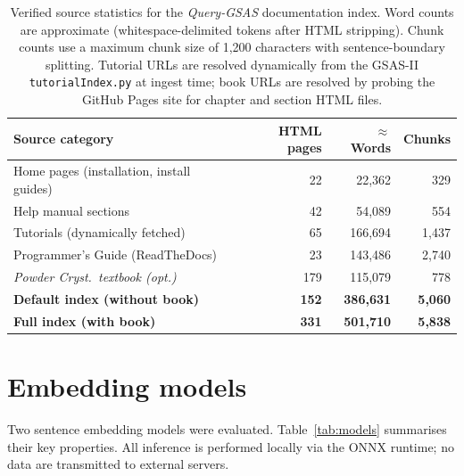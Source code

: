 \documentclass[12pt,a4paper]{article}
\begin{document}
\begin{table}[htbp]
  \centering
  \caption{Verified source statistics for the \textit{Query-GSAS} documentation
           index.
           Word counts are approximate (whitespace-delimited tokens after HTML
           stripping).
           Chunk counts use a maximum chunk size of 1{,}200 characters with
           sentence-boundary splitting.
           Tutorial URLs are resolved dynamically from the GSAS-II
           \texttt{tutorialIndex.py} at ingest time; book URLs are resolved by
           probing the GitHub Pages site for chapter and section HTML files.}
  \label{tab:corpus}
  \begin{tabular}{lrrr}
    \toprule
    Source category & HTML pages & $\approx$Words & Chunks \\
    \midrule
    Home pages (installation, install guides) & 22  & 22{,}362  & 329   \\
    Help manual sections                       & 42  & 54{,}089  & 554   \\
    Tutorials (dynamically fetched)            & 65  & 166{,}694 & 1{,}437 \\
    Programmer's Guide (ReadTheDocs)           & 23  & 143{,}486 & 2{,}740 \\
    \textit{Powder Cryst.\ textbook (opt.)}    & 179 & 115{,}079 & 778   \\
    \midrule
    \textbf{Default index (without book)}      & \textbf{152} & \textbf{386{,}631} & \textbf{5{,}060} \\
    \textbf{Full index (with book)}            & \textbf{331} & \textbf{501{,}710} & \textbf{5{,}838} \\
    \bottomrule
  \end{tabular}
\end{table}

\section{Embedding models}
\label{sec:embed}

Two sentence embedding models were evaluated.
Table~\ref{tab:models} summarises their key properties.
All inference is performed locally via the ONNX runtime;
no data are transmitted to external servers.
\end{document}
